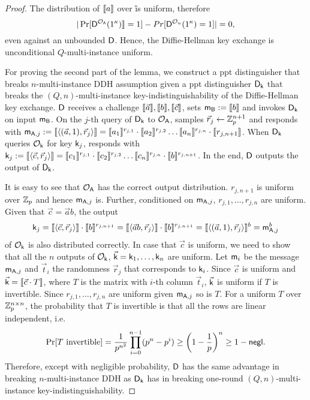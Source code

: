 \begin{proof}
The distribution of $\llbracket a\rrbracket$ over \G is uniform, therefore 
$$
|\Pr[ \mathsf D^{\mathcal{O}_{\mathsf{A}}}(1^{\kappa})\rrbracket=1]-Pr[ \mathsf D^{\mathcal{O}_{u}}(1^{\kappa})=1]|=0,
$$
even against an unbounded $\mathsf D$. Hence, the Diffie-Hellman key exchange is unconditional $Q$-multi-instance uniform.

For proving the second part of the lemma, we construct a ppt distinguisher \D that breaks $n$-multi-instance DDH assumption given a ppt distinguisher $\mathsf D_\mathsf{k}$ that breaks the $(Q,n)$-multi-instance key-indistinguishability of the Diffie-Hellman key exchange. $\mathsf D$ receives a challenge $\llbracket \vec{a}\rrbracket,\llbracket b\rrbracket,\llbracket \vec{c}\rrbracket$, sets $\mathsf{m}_{\mathsf{B}}:=\llbracket b\rrbracket$ and invokes $\mathsf D_{\mathsf{k}}$ on input $\mathsf{m}_{\mathsf{B}}$. On the $j$-th query of $\mathsf D_{\mathsf{k}}$ to $\mathcal{O}_{\mathsf{A}}$, \D samples $\vec{r}_j\leftarrow\mathbb Z_p^{n+1}$ and responds with $\mathsf{m}_{\mathsf{A},j}:=\llbracket \langle (\vec{a},1),\vec{r}_j\rangle\rrbracket=\llbracket a_1\rrbracket^{r_{j,1}}\cdot\llbracket a_2\rrbracket^{r_{j,2}}\ldots\llbracket a_n\rrbracket^{r_{j,n}}\cdot\llbracket r_{j,n+1}\rrbracket$. When $\mathsf D_{\mathsf{k}}$ queries $\mathcal{O}_{\mathsf{k}}$ for key $\mathsf{k}_j$, \D responds with $\mathsf{k}_j:=\llbracket \langle\vec{c},\vec{r}_j\rangle\rrbracket=\llbracket c_1\rrbracket^{r_{j,1}}\cdot\llbracket c_2\rrbracket^{r_{j,2}}\ldots\llbracket c_n\rrbracket^{r_{j,n}}\cdot\llbracket b\rrbracket^{r_{j,n+1}}$. In the end, $\mathsf D$ outputs the output of $\mathsf D_{\mathsf{k}}$.

It is easy to see that $\mathcal{O}_{\mathsf{A}}$ has the correct output distribution. $r_{j,n+1}$ is uniform over $\mathbb Z_p$ and hence $\mathsf{m}_{\mathsf{A},j}$ is. Further, conditioned on $\mathsf{m}_{\mathsf{A},j}$, $r_{j,1},\ldots,r_{j,n}$ are uniform. Given that $\vec{c}=\vec{a}b$, the output
$$
\mathsf{k}_j=\llbracket \langle\vec{c},\vec{r}_j\rangle\rrbracket\cdot\llbracket b\rrbracket^{r_{j,n+1}}=\llbracket \langle\vec{a}b,\vec{r}_j\rangle\rrbracket\cdot\llbracket b\rrbracket^{r_{j,n+1}}=\llbracket \langle(\vec{a},1),\vec{r}_j\rangle\rrbracket^b=\mathsf{m}_{\mathsf{A},j}^b
$$
of $\mathcal{O}_{\mathsf{k}}$ is also distributed correctly. In case that $\vec{c}$ is uniform, we need to show that all the $n$ outputs of $\mathcal{O}_{\mathsf{k}}$, $\vec{\mathsf{k}}=\mathsf{k}_1,\ldots,\mathsf{k}_n$ are uniform. Let $\mathsf{m}_i$ be the message $\mathsf{m}_{\mathsf{A},j}$ and $\vec{t}_i$ the randomness $\vec{r}_j$ that corresponds to $\mathsf{k}_i$. Since $\vec{c}$ is uniform and $\vec{\mathsf{k}}=\llbracket \vec{c}\cdot T\rrbracket$, where $T$ is the matrix with $i$-th column $\vec{t}_i$, $\vec{\mathsf{k}}$ is uniform if $T$ is invertible. Since $r_{j,1},\ldots,r_{j,n}$ are uniform given $\mathsf{m}_{\mathsf{A},j}$ so is $T$. For a uniform $T$ over $\mathbb Z_p^{n\times n}$, the probability that $T$ is invertible is that all the rows are linear independent, i.e. 
$$
\Pr[ T\text{ invertible}]= \frac{1}{p^{n^2}}\prod_{i=0}^{n-1}(p^n-p^i)\geq\left(1-\frac{1}{p}\right)^n\geq 1-\mathsf{negl}.
$$ 
Therefore, except with negligible probability, $\mathsf D$ has the same advantage in breaking $n$-multi-instance DDH as $\mathsf D_{\mathsf{k}}$ has in breaking one-round $(Q,n)$-multi-instance key-indistinguishability.
\pe
\end{proof}

